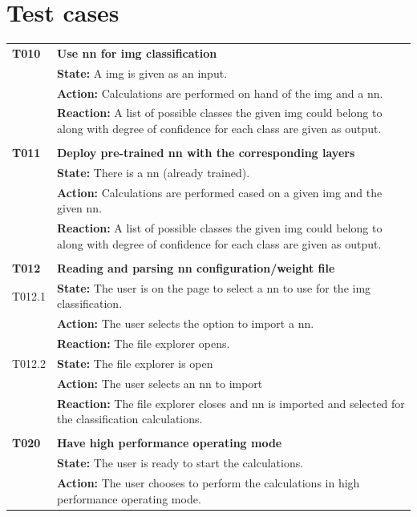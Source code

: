 \documentclass[parskip=full]{scrartcl}
\begin{document}
\section{Test cases}
\begin{tabular}{p{2cm}p{11.4cm}}
\textbf{T010} & \textbf{Use \gls{nn} for \gls{img} classification}\\
& \textbf{State:} A \gls{img} is given as an input.\\
& \textbf{Action:} Calculations are performed on hand of the \gls{img} and a \gls{nn}.\\
& \textbf{Reaction:} A list of possible classes the given \gls{img} could belong to along with degree of confidence for each class are given as output.\\
& \\
\textbf{T011} & \textbf{Deploy pre-trained \gls{nn} with the corresponding layers}\\
& \textbf{State:} There is a \gls{nn} (already trained).\\
& \textbf{Action:} Calculations are performed cased on a given \gls{img} and the given \gls{nn}.\\
& \textbf{Reaction:} A list of possible classes the given \gls{img} could belong to along with degree of confidence for each class are given as output.\\
& \\
\textbf{T012} & \textbf{Reading and parsing \gls{nn} configuration/weight file}\\
T012.1 & \textbf{State:}  The user is on the page to select a \gls{nn} to use for the \gls{img} classification.\\
& \textbf{Action:} The user selects the option to import a \gls{nn}.\\
& \textbf{Reaction:} The file explorer opens.\\
T012.2 & \textbf{State:} The file explorer is open\\
& \textbf{Action:} The user selects an \gls{nn} to import\\
& \textbf{Reaction:} The file explorer closes and \gls{nn} is imported and selected for the classification calculations.\\
& \\
\textbf{T020} & \textbf{Have high performance operating mode}\\
& \textbf{State:} The user is ready to start the calculations.\\
& \textbf{Action:} The user chooses to perform the calculations in high performance operating mode.\\

\end{tabular}
\end{document}
